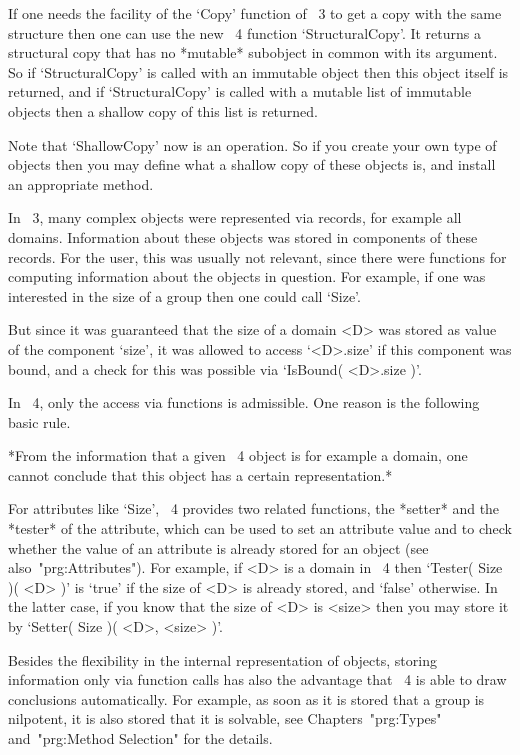 If one needs the facility of the `Copy' function of {\GAP}~3 to get a
copy with the same structure then one can use the new {\GAP}~4 function
`StructuralCopy'.
It returns a structural copy that has no *mutable* subobject in common
with its argument.
So if `StructuralCopy' is called with an immutable object then this
object itself is returned,
and if `StructuralCopy' is called with a mutable list of immutable
objects then a shallow copy of this list is returned.

Note that `ShallowCopy' now is an operation.
So if you create your own type of objects then you may define what a
shallow copy of these objects is, and install an appropriate method.



In {\GAP}~3, many complex objects were represented via records,
for example all domains.
Information about these objects was stored in components of these
records.
For the user, this was usually not relevant, since there were functions
for computing information about the objects in question.
For example, if one was interested in the size of a group then one could
call `Size'.

But since it was guaranteed that the size of a domain <D> was stored as
value of the component `size', it was allowed to access `<D>.size'
if this component was bound, and a check for this was possible via
`IsBound( <D>.size )'.

In {\GAP}~4, only the access via functions is admissible.
One reason is the following basic rule.

*From the information that a given {\GAP}~4 object is for example a
domain, one cannot conclude that this object has a certain
representation.*

For attributes like `Size', {\GAP}~4 provides two related functions,
the *setter* and the *tester* of the attribute, which can be used to
set an attribute value and to check whether the value of an attribute
is already stored for an object (see also~"prg:Attributes").
For example, if <D> is a domain in {\GAP}~4 then `Tester( Size )( <D> )'
is `true' if the size of <D> is already stored, and `false' otherwise.
In the latter case, if you know that the size of <D> is <size> then you
may store it by `Setter( Size )( <D>, <size> )'.

Besides the flexibility in the internal representation of objects,
storing information only via function calls has also the advantage that
{\GAP}~4 is able to draw conclusions automatically.
For example, as soon as it is stored that a group is nilpotent, it is
also stored that it is solvable, see Chapters~"prg:Types"
and~"prg:Method Selection" for the details.

